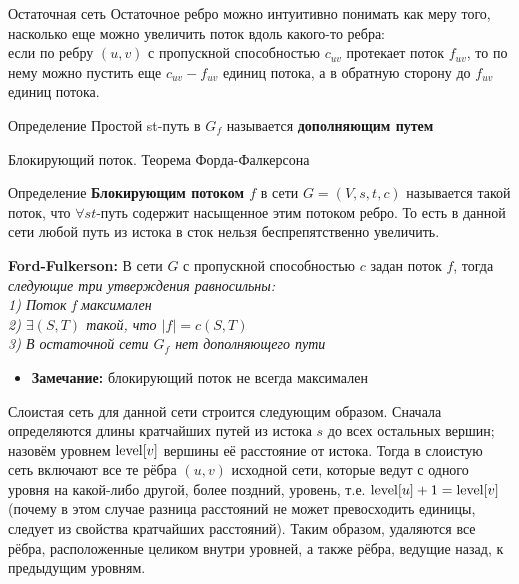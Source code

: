 \documentclass{beamer}
\begin{document}
\begin{frame}{Остаточная сеть}
Остаточное ребро можно интуитивно понимать как меру того, насколько еще можно увеличить поток вдоль какого-то ребра:\\ если по ребру $(u, v)$ с пропускной способностью $c_{uv}$ протекает поток $f_{uv}$, то по нему можно пустить еще $c_{uv} - f_{uv}$ единиц потока, а в обратную сторону до $f_{uv}$ единиц потока.
\begin{exampleblock}{Определение}
Простой st-путь в $G_{f}$ называется \textbf{дополняющим путем}
\end{exampleblock}
\end{frame}

\begin{frame}{Блокирующий поток. Теорема Форда-Фалкерсона}
    \begin{exampleblock}{Определение}
        \textbf{Блокирующим потоком $f$} в сети $G = (V, s, t, c)$ называется такой поток, что $\forall st$-путь содержит насыщенное этим потоком ребро. То есть в данной сети любой путь из истока в сток нельзя беспрепятственно увеличить.
    \end{exampleblock}
    \pause
    \begin{theorem}
        \textbf{Ford-Fulkerson:} В сети $G$ с пропускной способностью $c$ задан поток $f$, тогда \textit{следующие три утверждения равносильны:\\
        1) Поток f максимален\\
        2) $\exists (S, T)$ такой, что $|f| = c(S, T)$\\
        3) В остаточной сети $G_f$ нет дополняющего пути
        }
    \end{theorem}
    \begin{itemize}
        \item \textbf{Замечание: } блокирующий поток не всегда максимален
    \end{itemize}
\end{frame}

\begin{frame}{Слоистая сеть}
для данной сети строится следующим образом. Сначала определяются длины кратчайших путей из истока $s$ до всех остальных вершин; назовём уровнем ${\rm level}[v]$ вершины её расстояние от истока. Тогда в слоистую сеть включают все те рёбра $(u,v)$ исходной сети, которые ведут с одного уровня на какой-либо другой, более поздний, уровень, т.е. ${\rm level}[u] + 1 = {\rm level}[v]$ (почему в этом случае разница расстояний не может превосходить единицы, следует из свойства кратчайших расстояний). Таким образом, удаляются все рёбра, расположенные целиком внутри уровней, а также рёбра, ведущие назад, к предыдущим уровням.
\end{frame}
\end{document}
